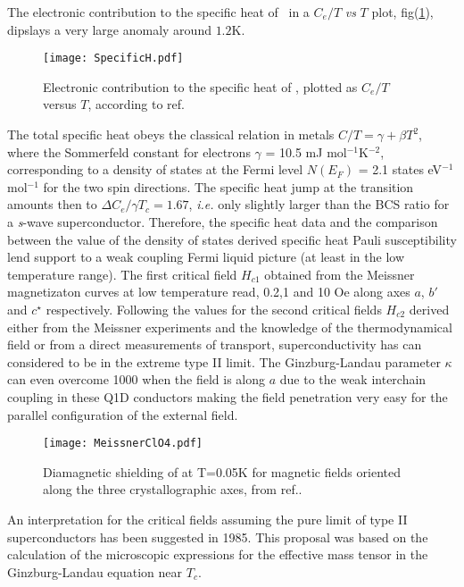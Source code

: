 \documentclass[11pt]{article} %
\begin{document}
The electronic contribution to the specific heat of \tmc\ in a $C_e/T$ {\it vs} $T$ plot, fig(\ref{SpecificH.pdf}), dipslays a very large anomaly around $1.2$K\cite{Garoche82}.
\begin{figure}[h]			
\centerline{\texttt{[image: SpecificH.pdf]}}
\caption{Electronic contribution to the specific heat of \tmc, plotted as $C_e/T$ versus $T$, according to ref.  \cite{Garoche82}}
\label{SpecificH.pdf}
\end{figure}
The total specific heat obeys the classical relation in metals $C/T	= \gamma + \beta T^2$,	where the Sommerfeld constant for electrons $\gamma$ = 10.5
mJ mol$^{-1}$K$^{-2}$, corresponding to a density of states at the Fermi level $N(E_F)$ = 2.1 states eV$^{-1}$ mol$^{-1}$ for the two spin directions\cite{Garoche82}. The specific
heat jump at the transition amounts then to $\Delta C_e /\gamma T_c = 1.67$, \textit{i.e.} only slightly larger than the BCS ratio for a {\it s}-wave superconductor. Therefore,  the  specific heat data and the comparison between  the value of the density of states derived  specific heat  Pauli susceptibility\cite{Miljak83} lend support to a weak coupling Fermi liquid picture (at least in the low temperature
range)\cite{Bourbonnais99}.
The first critical field $H_{c1}$ obtained from the Meissner magnetizaton curves at low temperature  read, 0.2,1 and 10 Oe along axes $a$, $b'$and $c^{\star}$ respectively. Following  the values for the second critical fields $H_{c2}$ derived either from the Meissner experiments and the knowledge of the thermodynamical field\cite{Mailly82} or from a direct measurements of transport, superconductivity has can considered to be in the extreme type II  limit. The Ginzburg-Landau parameter $\kappa$ can even overcome 1000 when the field is along $a$ due to the weak interchain coupling in these Q1D conductors making the field penetration very easy for the parallel configuration of the external field.
\begin{figure}[htbp]			
\centerline{\texttt{[image: MeissnerClO4.pdf]}}
\caption{Diamagnetic shielding of \tmc at T=0.05K  for magnetic fields oriented along the three crystallographic axes, from ref.\cite{Mailly82}.}
\label{MeissnerClO4.pdf}
\end{figure}
An interpretation for the critical fields assuming the pure limit of type II superconductors  has been suggested in 1985\cite{Gorkov85}. %
 This proposal was based on the calculation of the microscopic expressions for the effective mass tensor in the Ginzburg-Landau equation near $T_c$\cite{Gorkov64}. %
\end{document}
